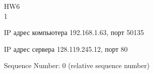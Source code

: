 \documentclass[a4paper,11pt]{article}
\begin{document}
\Large
HW6
\\
1

\begin{center}
\label{fig:image}
\end{center}
IP адрес компьютера 192.168.1.63, порт 50135

IP адрес сервера 128.119.245.12, порт 80

\begin{center}
\label{fig:image}
\end{center}
Sequence Number: 0    (relative sequence number)
\end{document}
